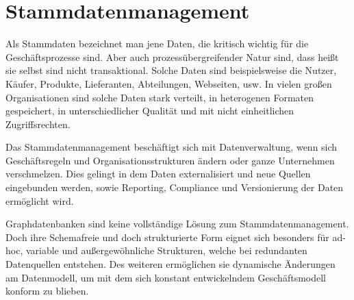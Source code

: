 \section{Stammdatenmanagement}
Als Stammdaten bezeichnet man jene Daten, die kritisch wichtig für die Geschäftsprozesse sind. Aber auch prozessübergreifender Natur sind, dass heißt sie selbst sind nicht transaktional. Solche Daten sind beispielsweise die Nutzer, Käufer, Produkte, Lieferanten, Abteilungen, Webseiten, usw. In vielen großen Organisationen sind solche Daten stark verteilt, in heterogenen Formaten gespeichert, in unterschiedlicher Qualität und mit nicht einheitlichen Zugriffsrechten. 

Das Stammdatenmanagement beschäftigt sich mit Datenverwaltung, wenn sich Geschäftsregeln und Organisationsstrukturen ändern oder ganze Unternehmen verschmelzen. Dies gelingt in dem Daten externalisiert und neue Quellen eingebunden werden, sowie Reporting, Compliance und Versionierung der Daten ermöglicht wird. 

Graphdatenbanken sind keine vollständige Lösung zum Stammdatenmanagement. Doch ihre Schemafreie und doch strukturierte Form eignet sich besonders für ad-hoc, variable und außergewöhnliche Strukturen, welche bei redundanten Datenquellen entstehen. Des weiteren ermöglichen sie dynamische Änderungen am Datenmodell, um mit dem sich konstant entwickelndem Geschäftsmodell konform zu blieben.\cite[p.~110]{GraphDB}
